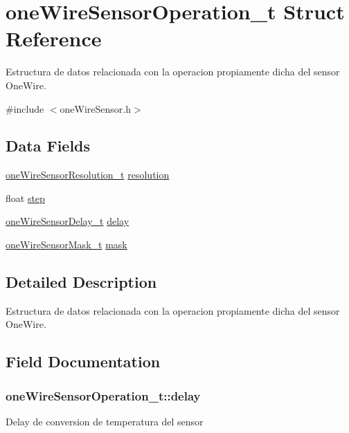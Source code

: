 \hypertarget{structoneWireSensorOperation__t}{}\section{one\+Wire\+Sensor\+Operation\+\_\+t Struct Reference}
\label{structoneWireSensorOperation__t}


Estructura de datos relacionada con la operacion propiamente dicha del sensor One\+Wire.  




{\ttfamily \#include $<$one\+Wire\+Sensor.\+h$>$}

\subsection*{Data Fields}
\begin{DoxyCompactItemize}
\item 
\hyperlink{oneWireSensor_8h_af81233465a38dc28904e0bce0032aa98}{one\+Wire\+Sensor\+Resolution\+\_\+t} \hyperlink{structoneWireSensorOperation__t_abd4196a82952b4f27576d2132e332311}{resolution}
\item 
float \hyperlink{structoneWireSensorOperation__t_ad0fc875806a44bf0290d18d7501f00dc}{step}
\item 
\hyperlink{oneWireSensor_8h_acaf718ffd1ab165dc25d0afe96c28230}{one\+Wire\+Sensor\+Delay\+\_\+t} \hyperlink{structoneWireSensorOperation__t_ab41c4b755d619512a08c987d4b5c0404}{delay}
\item 
\hyperlink{oneWireSensor_8h_a27df67930140466ba44e0a26af70947e}{one\+Wire\+Sensor\+Mask\+\_\+t} \hyperlink{structoneWireSensorOperation__t_ad949fa75df30e68b26cb13d1954f926f}{mask}
\end{DoxyCompactItemize}


\subsection{Detailed Description}
Estructura de datos relacionada con la operacion propiamente dicha del sensor One\+Wire. 

\subsection{Field Documentation}
\subsubsection[{\texorpdfstring{delay}{delay}}]{ one\+Wire\+Sensor\+Operation\+\_\+t\+::delay}\hypertarget{structoneWireSensorOperation__t_ab41c4b755d619512a08c987d4b5c0404}{}\label{structoneWireSensorOperation__t_ab41c4b755d619512a08c987d4b5c0404}
Delay de conversion de temperatura del sensor 
